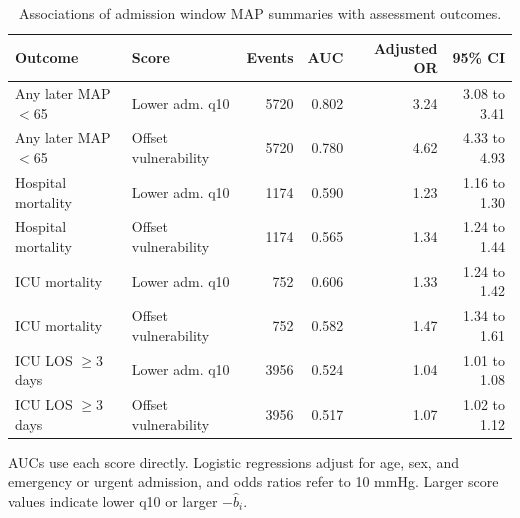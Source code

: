 \begin{table}[!htbp]
\caption{Associations of admission window MAP summaries with assessment outcomes.}
\label{tab:outcome_associations}
\centering
\begin{tabular}{llrrrr}
\hline
Outcome & Score & Events & AUC & Adjusted OR & 95\% CI\\
\hline
Any later MAP $<$65 & Lower adm. q10 & 5720 & 0.802 & 3.24 & 3.08 to 3.41\\
Any later MAP $<$65 & Offset vulnerability & 5720 & 0.780 & 4.62 & 4.33 to 4.93\\
Hospital mortality & Lower adm. q10 & 1174 & 0.590 & 1.23 & 1.16 to 1.30\\
Hospital mortality & Offset vulnerability & 1174 & 0.565 & 1.34 & 1.24 to 1.44\\
ICU mortality & Lower adm. q10 & 752 & 0.606 & 1.33 & 1.24 to 1.42\\
ICU mortality & Offset vulnerability & 752 & 0.582 & 1.47 & 1.34 to 1.61\\
ICU LOS $\ge$3 days & Lower adm. q10 & 3956 & 0.524 & 1.04 & 1.01 to 1.08\\
ICU LOS $\ge$3 days & Offset vulnerability & 3956 & 0.517 & 1.07 & 1.02 to 1.12\\
\hline
\end{tabular}
\par\smallskip
\footnotesize{AUCs use each score directly. Logistic regressions adjust for age, sex, and emergency or urgent admission, and odds ratios refer to 10 mmHg. Larger score values indicate lower q10 or larger $-\widehat b_i$.}
\end{table}
